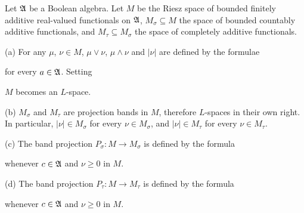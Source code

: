  Let $\frak A$ be a Boolean algebra.
Let $M$ be the Riesz space of bounded finitely
additive real-valued functionals on $\frak A$, $M_{\sigma}\subseteq M$
the space of bounded countably additive functionals, and
$M_{\tau}\subseteq M_{\sigma}$ the space of completely additive
functionals.

(a) For any $\mu$, $\nu\in M$, $\mu\vee\nu$, $\mu\wedge\nu$ and $|\nu|$
are defined by the formulae




\noindent for every $a\in\frak A$.   Setting


\noindent $M$ becomes an $L$-space.

(b) $M_{\sigma}$ and $M_{\tau}$ are projection bands in $M$, therefore
$L$-spaces in their own right.   In particular, $|\nu|\in M_{\sigma}$
for every $\nu\in M_{\sigma}$, and $|\nu|\in M_{\tau}$ for every
$\nu\in M_{\tau}$.

(c) The band projection $P_{\sigma}:M\to M_{\sigma}$ is defined by the
formula


\noindent whenever $c\in\frak A$ and $\nu\ge 0$ in $M$.

(d) The band projection $P_{\tau}:M\to M_{\tau}$ is defined by the
formula


\noindent whenever $c\in\frak A$ and $\nu\ge 0$ in $M$.


